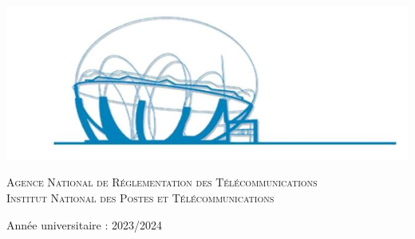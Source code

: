 \begin{center}
\begin{tabular}{p{1cm}lll}
\end{tabular}

\includegraphics[scale=0.65]{Logos/ZLAFA.png}


\textsc{Agence National de Réglementation des Télécommunications}\\
\textsc{Institut National des Postes et Télécommunications}

{\large Année universitaire : 2023/2024}
   
\end{center}



